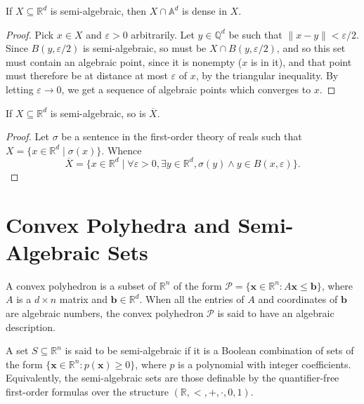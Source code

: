 \begin{lemma}
If $X\subseteq\mathbb{R}^d$ is semi-algebraic, then $X\cap\mathbb{A}^d$ is dense in $X$.
\end{lemma}

\begin{proof}
  Pick $x\in X$ and $\varepsilon>0$ arbitrarily. Let
  $y\in\mathbb{Q}^d$ be such that $\| x-y \|<\varepsilon/2$. Since
  $B(y,\varepsilon/2)$ is semi-algebraic, so must be $X\cap
  B(y,\varepsilon/2)$, and so this set must contain an algebraic
  point, since it is nonempty ($x$ is in it), and that point must
  therefore be at distance at most $\varepsilon$ of $x$, by the
  triangular inequality. By letting $\varepsilon\rightarrow 0$, we get
  a sequence of algebraic points which converges to $x$.
\end{proof}

\begin{lemma}
If $X\subseteq\mathbb{R}^d$ is semi-algebraic, so is $\overline{X}$.
\end{lemma}

\begin{proof}
  Let $\sigma$ be a sentence in the first-order theory of reals such
  that $X=\lbrace x\in\mathbb{R}^d\mid \sigma(x)\rbrace$. Whence
\begin{equation*}
  \overline{X}=\lbrace x\in\mathbb{R}^d\mid
\forall \varepsilon>0,\exists y\in\mathbb{R}^d,\sigma(y)\wedge y\in B(x,\varepsilon) \rbrace .
\end{equation*}
\end{proof}


\section{Convex Polyhedra and Semi-Algebraic Sets}

A convex polyhedron is a subset of $\mathbb{R}^{n}$ of the form $\mathcal{P} = \lbrace \boldsymbol{x} \in \mathbb{R}^{n} : A \boldsymbol{x} \leq \boldsymbol{b} \rbrace$, where $A$ is a $d \times n$ matrix and $\boldsymbol{b} \in \mathbb{R}^{d}$. When all the entries of $A$ and coordinates of $\boldsymbol{b}$ are algebraic numbers, the convex polyhedron $\mathcal{P}$ is said to have an algebraic description.

A set $S \subseteq \mathbb{R}^{n}$ is said to be semi-algebraic if it is a Boolean combination of sets of the form $\lbrace \boldsymbol{x} \in \mathbb{R}^{n}: p(\boldsymbol{x}) \geq 0\rbrace$, where $p$ is a polynomial with integer coefficients. Equivalently, the semi-algebraic sets are those definable by the quantifier-free first-order formulas over the structure $(\mathbb{R}, <, +, \cdot, 0, 1)$.

